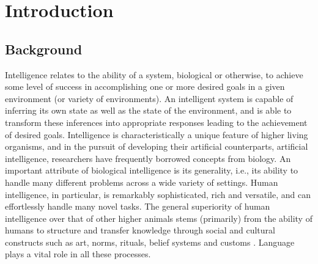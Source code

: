 \documentclass[10pt,journal,compsoc]{IEEEtran}
\begin{document}
	
	\maketitle
	
	
	\IEEEdisplaynontitleabstractindextext
	
	
	
	\IEEEpeerreviewmaketitle
	
	

	\section{Introduction}
	
	
	
	\subsection{Background}
	
	Intelligence relates to the ability of a system, biological or otherwise, to achieve some level of success in accomplishing one or more desired goals in a given environment (or variety of environments). An intelligent system is capable of inferring its own state as well as the state of the environment, and is able to transform these inferences into appropriate responses leading to the achievement of desired goals. Intelligence is characteristically a unique feature of higher living organisms, and in the pursuit of developing their artificial counterparts, artificial intelligence, researchers have frequently borrowed concepts from biology. An important attribute of biological intelligence is its generality, i.e., its ability to handle many different problems across a wide variety of settings. Human intelligence, in particular, is remarkably sophisticated, rich and versatile, and can effortlessly handle many novel tasks. The general superiority of human intelligence over that of other higher animals stems (primarily) from the ability of humans to structure and transfer knowledge through social and cultural constructs such as art, norms, rituals, belief systems and customs \cite{adams2012beyond}. Language plays a vital role in all these processes. 
	
\end{document}
